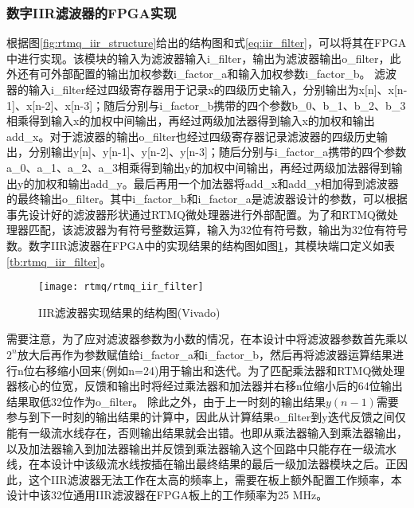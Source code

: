 \subsubsection[高速通用数字IIR滤波器的FPGA实现]{数字IIR滤波器的FPGA实现}

根据图\ref{fig:rtmq_iir_structure}给出的结构图和式\eqref{eq:iir_filter}，可以将其在FPGA中进行实现。该模块的输入为滤波器输入i\_filter，输出为滤波器输出o\_filter，此外还有可外部配置的输出加权参数i\_factor\_a和输入加权参数i\_factor\_b。
滤波器的输入i\_filter经过四级寄存器用于记录x的四级历史输入，分别输出为x[n]、x[n-1]、x[n-2]、x[n-3]；随后分别与i\_factor\_b携带的四个参数b\_0、b\_1、b\_2、b\_3相乘得到输入x的加权中间输出，再经过两级加法器得到输入x的加权和输出add\_x。对于滤波器的输出o\_filter也经过四级寄存器记录滤波器的四级历史输出，分别输出y[n]、y[n-1]、y[n-2]、y[n-3]；随后分别与i\_factor\_a携带的四个参数a\_0、a\_1、a\_2、a\_3相乘得到输出y的加权中间输出，再经过两级加法器得到输出y的加权和输出add\_y。最后再用一个加法器将add\_x和add\_y相加得到滤波器的最终输出o\_filter。其中i\_factor\_b和i\_factor\_a是滤波器设计的参数，可以根据事先设计好的滤波器形状通过RTMQ微处理器进行外部配置。为了和RTMQ微处理器匹配，该滤波器为有符号整数运算，输入为32位有符号数，输出为32位有符号数。数字IIR滤波器在FPGA中的实现结果的结构图如图\ref{fig:iir_filter_vivado}，其模块端口定义如表\ref{tb:rtmq_iir_filter}。

\begin{figure}
    \centering
    \texttt{[image: rtmq/rtmq\_iir\_filter]}
    \caption[IIR滤波器实现结果的结构图]{IIR滤波器实现结果的结构图(Vivado)\label{fig:iir_filter_vivado}}
\end{figure}

需要注意，为了应对滤波器参数为小数的情况，在本设计中将滤波器参数首先乘以$2^{n}$放大后再作为参数赋值给i\_factor\_a和i\_factor\_b，然后再将滤波器运算结果进行n位右移缩小回来(例如n=24)用于输出和迭代。为了匹配乘法器和RTMQ微处理器核心的位宽，反馈和输出时将经过乘法器和加法器并右移n位缩小后的64位输出结果取低32位作为o\_filter。
除此之外，由于上一时刻的输出结果$y(n-1)$需要参与到下一时刻的输出结果的计算中，因此从计算结果o\_filter到y迭代反馈之间仅能有一级流水线存在，否则输出结果就会出错。也即从乘法器输入到乘法器输出，以及加法器输入到加法器输出并反馈到乘法器输入这个回路中只能存在一级流水线，在本设计中该级流水线按插在输出最终结果的最后一级加法器模块之后。正因此，这个IIR滤波器无法工作在太高的频率上，需要在板上额外配置工作频率，本设计中该32位通用IIR滤波器在FPGA板上的工作频率为25 MHz。


